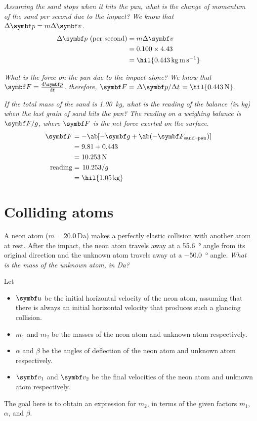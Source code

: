 \it{Assuming the sand stops when it hits the pan, what is the change
of momentum of the sand per second due to the impact?}
We know that \(\Delta\mv{p} = m\Delta\mv{v}\).
\begin{align*}
  \Delta\mv{p} \text{ (per second)} &= m\Delta\mv{v} \\
  &= 0.100 \times 4.43 \\
  &= \hil{\qty{0.443}{\kg\metre\per\second}}
\end{align*}

\it{What is the force on the pan due to the impact alone?}
We know that \(\mv{F} = \odv{\mv{p}}{t}\). therefore, \(\mv{F} =
\lf{\Delta\mv{p}}{\Delta t} = \hil{\qty{0.443}{\newton}}\).

\it{If the total mass of the sand is \qty{1.00}{\kg}, what is the
  reading of the balance (in \unit{\kg}) when the last grain of sand
hits the pan?}
The reading on a weighing balance is \(\mv{F}/g\), where \(\mv{F}\)
is the net force exerted on the surface.
\begin{align*}
  \mv{F} &= -\ab[-\mv{g} + \ab(-\mv{F}_\text{sand--pan})] \\
  &= 9.81 + 0.443 \\
  &= \qty{10.253}{\newton}\\
  \text{reading} &= \lf{10.253}{g} \\
  &= \hil{\qty{1.05}{\kg}}
\end{align*}

\section{Colliding atoms}
A neon atom (\(m = \qty{20.0}{\dalton}\)) makes a perfectly elastic
collision with another atom at rest.
After the impact, the neon atom travels away at a \qty{55.6}{\degree}
angle from its original direction
and the unknown atom travels away at a \qty{-50.0}{\degree} angle.
\it{What is the mass of the unknown atom, in \unit{\dalton}?}

Let
\begin{itemize}
  \item \(\mv{u}\) be the initial horizontal velocity of the neon
    atom, assuming that there is always an initial horizontal
    velocity that produces such a glancing collision.
  \item \(m_1\) and \(m_2\) be the masses of the neon atom and
    unknown atom respectively.
  \item \(\alpha\) and \(\beta\) be the angles of deflection of the
    neon atom and unknown atom respectively.
  \item \(\mv{v}_1\) and \(\mv{v}_2\) be the final velocities of the
    neon atom and unknown atom respectively.
\end{itemize}
The goal here is to obtain an expression for \(m_2\), in terms of the
given factors
\(m_1\), \(\alpha\), and \(\beta\).

